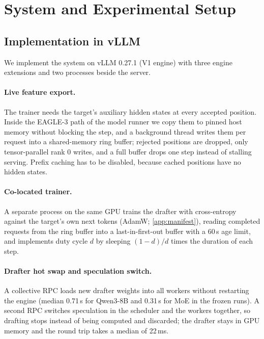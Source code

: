 \documentclass{article}
\begin{document}
\section{System and Experimental Setup}\label{sec:system}

\subsection{Implementation in vLLM}\label{sec:impl}

We implement the system on vLLM 0.27.1 (V1 engine) with three engine extensions and two processes beside the server.

\paragraph{Live feature export.} The trainer needs the target's auxiliary hidden states at every accepted position. Inside the EAGLE-3 path of the model runner we copy them to pinned host memory without blocking the step, and a background thread writes them per request into a shared-memory ring buffer; rejected positions are dropped, only tensor-parallel rank 0 writes, and a full buffer drops one step instead of stalling serving. Prefix caching has to be disabled, because cached positions have no hidden states.

\paragraph{Co-located trainer.} A separate process on the same GPU trains the drafter with cross-entropy against the target's own next tokens (AdamW; \cref{app:manifest}), reading completed requests from the ring buffer into a last-in-first-out buffer with a 60\,s age limit, and implements duty cycle $d$ by sleeping $(1-d)/d$ times the duration of each step.

\paragraph{Drafter hot swap and speculation switch.} A collective RPC loads new drafter weights into all workers without restarting the engine (median 0.71\,s for Qwen3-8B and 0.31\,s for MoE in the frozen runs). A second RPC switches speculation in the scheduler and the workers together, so drafting stops instead of being computed and discarded; the drafter stays in GPU memory and the round trip takes a median of 22\,ms.
\end{document}
